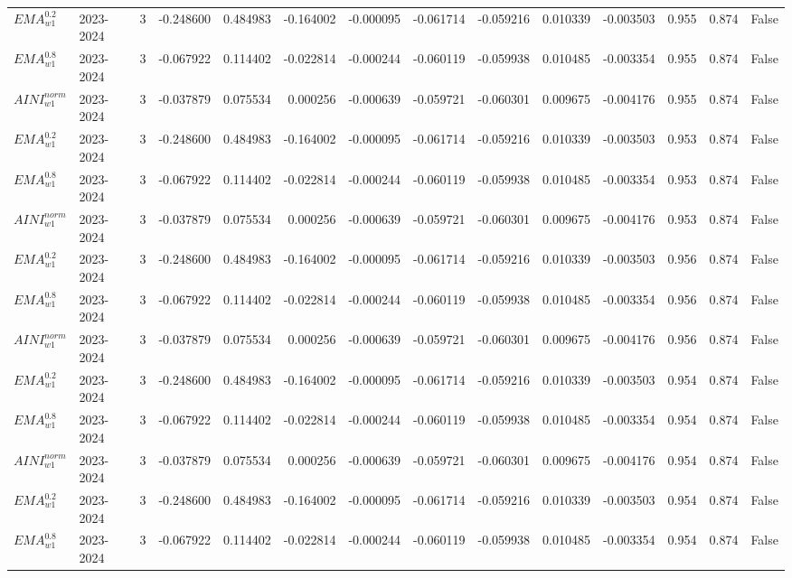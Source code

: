 \begin{tabular}{@{}llrrrrrrrrrlll@{}}
$EMA^{0.2}_{w1}$ & 2023-2024 & 3 & -0.248600 & 0.484983 & -0.164002 & -0.000095 & -0.061714 & -0.059216 & 0.010339 & -0.003503 & 0.955 & 0.874 & False \\
$EMA^{0.8}_{w1}$ & 2023-2024 & 3 & -0.067922 & 0.114402 & -0.022814 & -0.000244 & -0.060119 & -0.059938 & 0.010485 & -0.003354 & 0.955 & 0.874 & False \\
$AINI^{norm}_{w1}$ & 2023-2024 & 3 & -0.037879 & 0.075534 & 0.000256 & -0.000639 & -0.059721 & -0.060301 & 0.009675 & -0.004176 & 0.955 & 0.874 & False \\
$EMA^{0.2}_{w1}$ & 2023-2024 & 3 & -0.248600 & 0.484983 & -0.164002 & -0.000095 & -0.061714 & -0.059216 & 0.010339 & -0.003503 & 0.953 & 0.874 & False \\
$EMA^{0.8}_{w1}$ & 2023-2024 & 3 & -0.067922 & 0.114402 & -0.022814 & -0.000244 & -0.060119 & -0.059938 & 0.010485 & -0.003354 & 0.953 & 0.874 & False \\
$AINI^{norm}_{w1}$ & 2023-2024 & 3 & -0.037879 & 0.075534 & 0.000256 & -0.000639 & -0.059721 & -0.060301 & 0.009675 & -0.004176 & 0.953 & 0.874 & False \\
$EMA^{0.2}_{w1}$ & 2023-2024 & 3 & -0.248600 & 0.484983 & -0.164002 & -0.000095 & -0.061714 & -0.059216 & 0.010339 & -0.003503 & 0.956 & 0.874 & False \\
$EMA^{0.8}_{w1}$ & 2023-2024 & 3 & -0.067922 & 0.114402 & -0.022814 & -0.000244 & -0.060119 & -0.059938 & 0.010485 & -0.003354 & 0.956 & 0.874 & False \\
$AINI^{norm}_{w1}$ & 2023-2024 & 3 & -0.037879 & 0.075534 & 0.000256 & -0.000639 & -0.059721 & -0.060301 & 0.009675 & -0.004176 & 0.956 & 0.874 & False \\
$EMA^{0.2}_{w1}$ & 2023-2024 & 3 & -0.248600 & 0.484983 & -0.164002 & -0.000095 & -0.061714 & -0.059216 & 0.010339 & -0.003503 & 0.954 & 0.874 & False \\
$EMA^{0.8}_{w1}$ & 2023-2024 & 3 & -0.067922 & 0.114402 & -0.022814 & -0.000244 & -0.060119 & -0.059938 & 0.010485 & -0.003354 & 0.954 & 0.874 & False \\
$AINI^{norm}_{w1}$ & 2023-2024 & 3 & -0.037879 & 0.075534 & 0.000256 & -0.000639 & -0.059721 & -0.060301 & 0.009675 & -0.004176 & 0.954 & 0.874 & False \\
$EMA^{0.2}_{w1}$ & 2023-2024 & 3 & -0.248600 & 0.484983 & -0.164002 & -0.000095 & -0.061714 & -0.059216 & 0.010339 & -0.003503 & 0.954 & 0.874 & False \\
$EMA^{0.8}_{w1}$ & 2023-2024 & 3 & -0.067922 & 0.114402 & -0.022814 & -0.000244 & -0.060119 & -0.059938 & 0.010485 & -0.003354 & 0.954 & 0.874 & False \\

\end{tabular}
